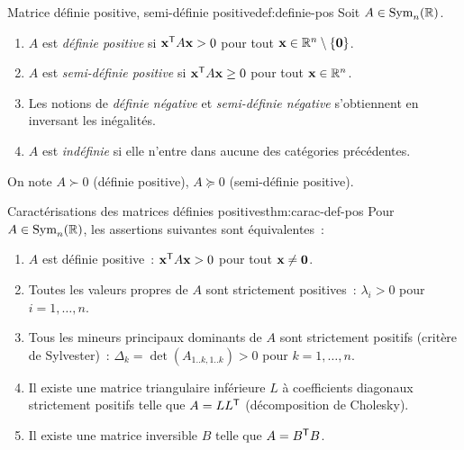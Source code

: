 \begin{definition}{Matrice définie positive, semi-définie positive}{def:definie-pos}
  Soit $A \in \operatorname{Sym}_n({\mathbb{R}})$.
  \begin{enumerate}[label=(\roman*)]
    \item $A$ est \emph{définie positive} si
      ${\mathbf{x}}^{\mathsf{T}} A \mathbf{x} > 0$ pour tout
      $\mathbf{x} \in {\mathbb{R}}^n \setminus \left\{\mathbf{0}\right\}$.
    \item $A$ est \emph{semi-définie positive} si
      ${\mathbf{x}}^{\mathsf{T}} A \mathbf{x} \geq 0$ pour tout $\mathbf{x} \in {\mathbb{R}}^n$.
    \item Les notions de \emph{définie négative} et \emph{semi-définie
      négative} s'obtiennent en inversant les inégalités.
    \item $A$ est \emph{indéfinie} si elle n'entre dans aucune des
      catégories précédentes.
  \end{enumerate}
  On note $A \succ 0$ (définie positive), $A \succeq 0$ (semi-définie
  positive).
\end{definition}

\begin{theorem}{Caractérisations des matrices définies positives}{thm:carac-def-pos}
  Pour $A \in \operatorname{Sym}_n({\mathbb{R}})$, les assertions suivantes sont
  équivalentes~:
  \begin{enumerate}[label=(\roman*)]
    \item $A$ est définie positive~: ${\mathbf{x}}^{\mathsf{T}} A \mathbf{x} > 0$
      pour tout $\mathbf{x} \neq \mathbf{0}$.
    \item Toutes les valeurs propres de $A$ sont strictement positives~:
      $\lambda_i > 0$ pour $i = 1, \ldots, n$.
    \item Tous les mineurs principaux dominants de $A$ sont strictement
      positifs (critère de Sylvester)~:
      $\Delta_k = \det(A_{1..k, 1..k}) > 0$ pour $k = 1, \ldots, n$.
    \item Il existe une matrice triangulaire inférieure $L$ à coefficients
      diagonaux strictement positifs telle que $A = L{L}^{\mathsf{T}}$
      (décomposition de Cholesky).
    \item Il existe une matrice inversible $B$ telle que $A = {B}^{\mathsf{T}}B$.
  \end{enumerate}
\end{theorem}


